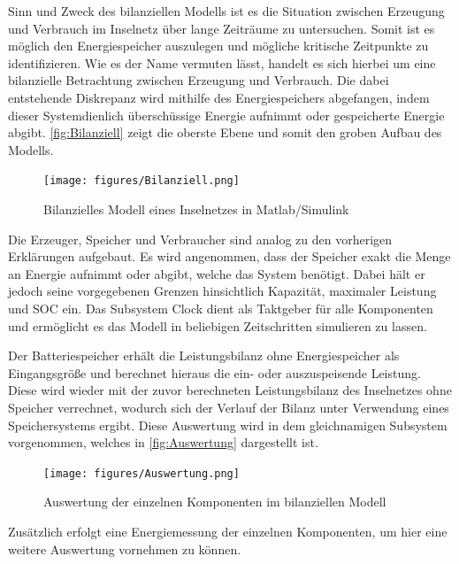 Sinn und Zweck des bilanziellen Modells ist es die Situation zwischen Erzeugung und Verbrauch im Inselnetz über lange Zeiträume zu untersuchen. Somit ist es möglich den Energiespeicher auszulegen und mögliche kritische Zeitpunkte zu identifizieren. Wie es der Name vermuten lässt, handelt es sich hierbei um eine bilanzielle Betrachtung zwischen Erzeugung und Verbrauch. Die dabei entstehende Diskrepanz wird mithilfe des Energiespeichers abgefangen, indem dieser Systemdienlich überschüssige Energie aufnimmt oder gespeicherte Energie abgibt. \autoref{fig:Bilanziell} zeigt die oberste Ebene und somit den groben Aufbau des Modells.

\begin{figure}[H]
	\centering
	\texttt{[image: figures/Bilanziell.png]}
	\caption{Bilanzielles Modell eines Inselnetzes in Matlab/Simulink}
	\label{fig:Bilanziell}
\end{figure}

Die Erzeuger, Speicher und Verbraucher sind analog zu den vorherigen Erklärungen aufgebaut. Es wird angenommen, dass der Speicher exakt die Menge an Energie aufnimmt oder abgibt, welche das System benötigt. Dabei hält er jedoch seine vorgegebenen Grenzen hinsichtlich Kapazität, maximaler Leistung und SOC ein. Das Subsystem Clock dient als Taktgeber für alle Komponenten und ermöglicht es das Modell in beliebigen Zeitschritten simulieren zu lassen. 


Der Batteriespeicher erhält die Leistungsbilanz ohne Energiespeicher als Eingangsgröße und berechnet hieraus die ein- oder auszuspeisende Leistung. Diese wird wieder mit der zuvor berechneten Leistungsbilanz des Inselnetzes ohne Speicher verrechnet, wodurch sich der Verlauf der Bilanz unter Verwendung eines Speichersystems ergibt. Diese Auswertung wird in dem gleichnamigen Subsystem vorgenommen, welches in \autoref{fig:Auswertung} dargestellt ist.

\begin{figure}[H]
	\centering
	\texttt{[image: figures/Auswertung.png]}
	\caption{Auswertung der einzelnen Komponenten im bilanziellen Modell}
	\label{fig:Auswertung}
\end{figure}

Zusätzlich erfolgt eine Energiemessung der einzelnen Komponenten, um hier eine weitere Auswertung vornehmen zu können.

